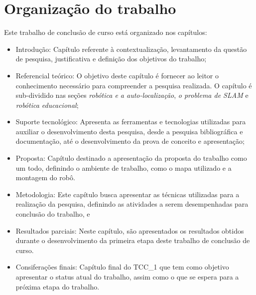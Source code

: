	\section{Organização do trabalho} %
	\label{sec:organização_do_trabalho}
		Este trabalho de conclusão de curso está organizado nos capítulos:
		\begin{itemize}
			\item Introdução: Capítulo referente à contextualização, levantamento da questão de pesquisa, justificativa e definição dos objetivos do trabalho;

			\item Referencial teórico: O objetivo deste capítulo é fornecer ao leitor o conhecimento necessário para compreender a pesquisa realizada. O capítulo é sub-dividido nas seções \textit{robótica e a auto-localização},  \textit{o problema de SLAM} e \textit{robótica educacional};

			\item Suporte tecnológico: Apresenta as ferramentas e tecnologias utilizadas para auxiliar o desenvolvimento desta pesquisa, desde a pesquisa bibliográfica e documentação, até o desenvolvimento da prova de conceito e apresentação;

			\item Proposta: Capítulo destinado a apresentação da proposta do trabalho como um todo, definindo o ambiente de trabalho, como o mapa utilizado e a montagem do robô.

			\item Metodologia: Este capítulo busca apresentar as técnicas utilizadas para a realização da pesquisa, definindo as atividades a serem desempenhadas para conclusão do trabalho, e

			\item Resultados parciais: Neste capítulo, são apresentados os resultados obtidos durante o desenvolvimento da primeira etapa deste trabalho de conclusão de curso.

			\item Consiferações finais: Capítulo final do TCC\_1 que tem como objetivo apresentar o status atual do trabalho, assim como o que se espera para a próxima etapa do trabalho.
		\end{itemize}
